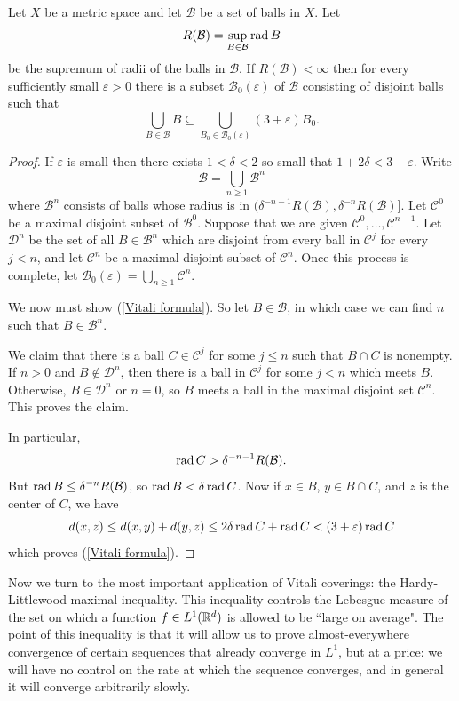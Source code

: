 \begin{theorem}
Let $X$ be a metric space and let $\mathcal B$ be a set of balls in $X$. Let
\[R(\mathcal B) = \sup_{B \in \mathcal B} \operatorname{rad} B\]
be the supremum of radii of the balls in $\mathcal B$. If $R(\mathcal B) < \infty$ then for every sufficiently small $\varepsilon > 0$ there is a subset $\mathcal B_{0}(\varepsilon)$ of $\mathcal B$ consisting of disjoint balls such that
\begin{equation}\label{Vitali formula}
\bigcup_{B \in \mathcal B} B \subseteq \bigcup_{B_{0} \in \mathcal B_{0}(\varepsilon)} (3 + \varepsilon)B_{0}.
\end{equation}
\end{theorem}
\begin{proof}
If $\varepsilon$ is small then there exists $1 < \delta < 2$ so small that $1 + 2\delta < 3 + \varepsilon$.
Write
\[\mathcal B = \bigcup_{n \geq 1} \mathcal B^n\]
where $\mathcal B^n$ consists of balls whose radius is in $(\delta^{-n-1}R(\mathcal B), \delta^{-n}R(\mathcal B)]$.
Let $\mathcal C^0$ be a maximal disjoint subset of $\mathcal B^0$.
Suppose that we are given $\mathcal C^0, \dots, \mathcal C^{n - 1}$.
Let $\mathcal D^{n}$ be the set of all $B \in \mathcal B^{n}$ which are disjoint from every ball in $\mathcal C^{j}$ for every $j < n$, and let $\mathcal C^{n}$ be a maximal disjoint subset of $\mathcal C^{n}$.
Once this process is complete, let $\mathcal B_{0}(\varepsilon) = \bigcup_{n \geq 1} \mathcal C^{n}$.

We now must show (\ref{Vitali formula}).
So let $B \in \mathcal B$, in which case we can find $n$ such that $B \in \mathcal B^{n}$.

We claim that there is a ball $C \in \mathcal C^{j}$ for some $j \leq n$ such that $B \cap C$ is nonempty.
If $n > 0$ and $B \notin \mathcal D^{n}$, then there is a ball in $\mathcal C^{j}$ for some $j < n$ which meets $B$.
Otherwise, $B \in \mathcal D^{n}$ or $n = 0$, so $B$ meets a ball in the maximal disjoint set $\mathcal C^{n}$.
This proves the claim.

In particular,
\[\operatorname{rad} C > \delta^{-n-1}R(\mathcal B).\]
But $\operatorname{rad} B \leq \delta^{-n}R(\mathcal B)$, so $\operatorname{rad} B < \delta\operatorname{rad} C$. Now if $x \in B$, $y \in B \cap C$, and $z$ is the center of $C$, we have
\[d(x, z) \leq d(x, y) + d(y, z) \leq 2\delta \operatorname{rad} C + \operatorname{rad} C < (3 + \varepsilon) \operatorname{rad} C\]
which proves (\ref{Vitali formula}).
\end{proof}

\begin{subsec}
Now we turn to the most important application of Vitali coverings: the Hardy-Littlewood maximal inequality.
This inequality controls the Lebesgue measure of the set on which a function $f \in L^1(\mathbb{R}^d)$ is allowed to be ``large on average".
The point of this inequality is that it will allow us to prove almost-everywhere convergence of certain sequences that already converge in $L^1$, but at a price: we will have no control on the rate at which the sequence converges, and in general it will converge arbitrarily slowly.
\end{subsec}

